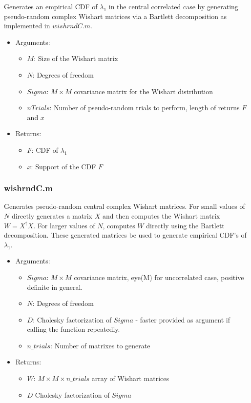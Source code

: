 Generates an empirical CDF of $\lambda_1$ in the central correlated case by generating pseudo-random complex Wishart matrices via a Bartlett decomposition as implemented in $wishrndC.m$.

\begin{itemize}
\item Arguments:
\begin{itemize}
\item $M$: Size of the Wishart matrix
\item $N$: Degrees of freedom
\item $Sigma$: $M\times M$ covariance matrix for the Wishart distribution
\item $nTrials$: Number of pseudo-random trials to perform, length of returns $F$ and $x$
\end{itemize}
\item Returns:
\begin{itemize}
\item $F$: CDF of $\lambda_1$
\item $x$: Support of the CDF $F$
\end{itemize}
\end{itemize}

\subsubsection*{wishrndC.m}

Generates pseudo-random central complex Wishart matrices. For small values of $N$ directly generates a matrix $X$ and then computes the Wishart matrix $W=X^\dagger X$. For larger values of $N$, computes $W$ directly using the Bartlett decomposition. These generated matrices be used to generate empirical CDF's of $\lambda_1$.
\begin{itemize}
\item Arguments:
\begin{itemize}
\item $Sigma$: $M\times M$ covariance matrix, eye(M) for uncorrelated case, positive definite in general.
\item $N$: Degrees of freedom
\item $D$: Cholesky factorization of $Sigma$ - faster provided as argument if calling the function repeatedly.
\item $n\_trials$: Number of matrixes to generate
\end{itemize}
\item Returns:
\begin{itemize}
\item $W$: $M\times M\times n\_trials$ array of Wishart matrices
\item $D$ Cholesky factorization of $Sigma$
\end{itemize}
\end{itemize}
